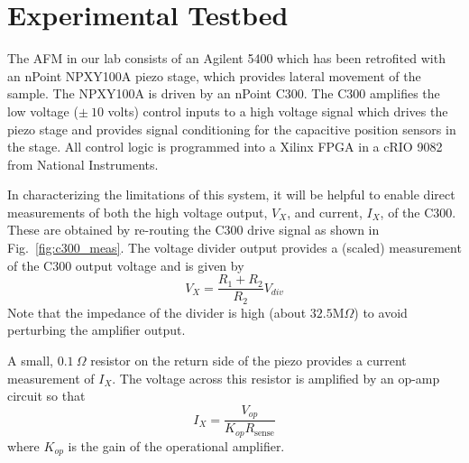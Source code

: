 \documentclass[journal,twocolumn,twoside]{IEEEtran}
\begin{document}
\section{Experimental Testbed}\label{sec:testbed}
  

The AFM in our lab consists of an Agilent 5400 which has been retrofited with an nPoint NPXY100A piezo stage, which provides lateral movement of the sample. The NPXY100A is driven by an nPoint C300. The C300 amplifies the low voltage ($\pm~10$ volts) control inputs to a high voltage signal which drives the piezo stage and provides signal conditioning for the capacitive position sensors in the stage. All control logic is programmed into a Xilinx FPGA in a cRIO 9082 from National Instruments.

In characterizing the limitations of this system, it will be helpful to enable direct measurements of both the high voltage output, $V_X$, and current, $I_X$, of the C300. These are obtained by re-routing the C300 drive signal as shown in Fig.~\ref{fig:c300_meas}. The voltage divider output provides a (scaled) measurement of the C300 output voltage and is given by
\begin{equation}
V_X = \frac{R_1 + R_2}{R_2}V_{div}
\end{equation}
Note that the impedance of the divider is high (about $32.5\text{M}\Omega$) to avoid perturbing the amplifier output.

A small, $0.1~\Omega$ resistor on the return side of the piezo provides a current measurement of $I_X$. The voltage across this resistor is amplified by an op-amp circuit so that
\begin{equation}
I_{X} = \frac{V_{op}}{K_{op}R_{\text{sense}}}
\end{equation}
where $K_{op}$ is the gain of the operational amplifier.
\end{document}
